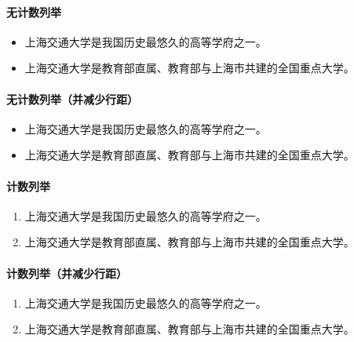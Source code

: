 \paragraph{无计数列举}
\begin{itemize}
    \item 上海交通大学是我国历史最悠久的高等学府之一。
    \item 上海交通大学是教育部直属、教育部与上海市共建的全国重点大学。
\end{itemize}

\paragraph{无计数列举（并减少行距）}
\begin{itemize}[nolistsep]
    \item 上海交通大学是我国历史最悠久的高等学府之一。
    \item 上海交通大学是教育部直属、教育部与上海市共建的全国重点大学。
\end{itemize}

\paragraph{计数列举}
\begin{enumerate}
    \item 上海交通大学是我国历史最悠久的高等学府之一。
    \item 上海交通大学是教育部直属、教育部与上海市共建的全国重点大学。
\end{enumerate}

\paragraph{计数列举（并减少行距）}
\begin{enumerate}[nolistsep]
    \item 上海交通大学是我国历史最悠久的高等学府之一。
    \item 上海交通大学是教育部直属、教育部与上海市共建的全国重点大学。
\end{enumerate}